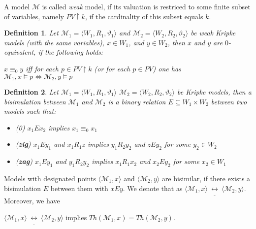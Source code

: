 \documentclass[a4paper]{article}
\theoremstyle{defin}
\newtheorem{defin}{Definition}
\theoremstyle{theorem}
\theoremstyle{prop}
\theoremstyle{lemma}
\theoremstyle{fact}
\theoremstyle{ex}
\theoremstyle{col}
\theoremstyle{claim}
\begin{document}
A model $\mathcal{M}$ is called \emph{weak} model, if its valuation is restriced to some finite subset of variables, namely $PV \upharpoonright k$, if the cardinality of this subset equals $k$.

\begin{defin}
Let $\mathcal{M}_1 = \langle W_1, R_1, \vartheta_1 \rangle$ and $\mathcal{M}_2 = \langle W_2, R_2, \vartheta_2 \rangle$ be weak Kripke models (with the same variables), $x \in W_1$, and $y \in W_2$, then $x$ and $y$ are $0$-equivalent, if the following holds:

\begin{center}
  $x \equiv_0 y$ iff for each $p \in PV \upharpoonright k$ (or for each $p \in PV$) one has $\mathcal{M}_1, x \models p \Leftrightarrow \mathcal{M}_2, y \models p$
\end{center}
\end{defin}

\begin{defin}
  Let $\mathcal{M}_1 = \langle W_1, R_1, \vartheta_1 \rangle$ $\mathcal{M}_2 = \langle W_2, R_2, \vartheta_2 \rangle$ be Kripke models, then a bisimulation between $\mathcal{M}_1$ and $\mathcal{M}_2$ is a binary relation $E \subseteq W_1 \times W_2$ between two models such that:
  \begin{itemize}
    \item (0) $x_1 E x_2$ implies $x_1 \equiv_0 x_1$
    \item ({\bf zig}) $x_1 E y_1$ and $x_1 R_1 z$ implies $y_1 R_2 y_2$ and $z E y_2$ for some $y_2 \in W_2$
    \item ({\bf zag}) $x_1 E y_1$ and $y_1 R_2 y_2$ implies $x_1 R_1 x_2$ and $x_2 E y_2$ for some $x_2 \in W_1$
  \end{itemize}
\end{defin}

Models with designated points $\langle \mathcal{M}_1, x \rangle$ and  $\langle \mathcal{M}_2, y \rangle$ are bisimilar, if there exists a bisimulation $E$ between them with $x E y$. We denote that as $\langle \mathcal{M}_1, x \rangle \: \underline{\leftrightarrow} \: \langle \mathcal{M}_2, y \rangle$. Moreover, we have
\begin{center}
  $\langle \mathcal{M}_1, x \rangle \: \underline{\leftrightarrow} \: \langle \mathcal{M}_2, y \rangle$ implies $Th(\mathcal{M}_1, x) = Th(\mathcal{M}_2, y)$.
\end{center}
\end{document}
